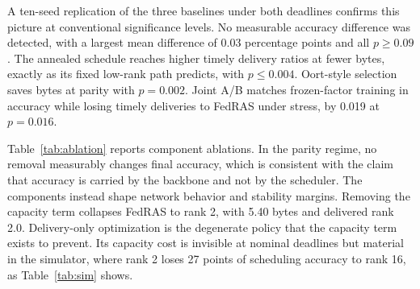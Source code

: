 \documentclass[preprint,12pt]{elsarticle}
\begin{document}
A ten-seed replication of the three baselines under both deadlines confirms this picture at conventional significance levels. No measurable accuracy difference was detected, with a largest mean difference of 0.03 percentage points and all $p\ge0.09$. The annealed schedule reaches higher timely delivery ratios at fewer bytes, exactly as its fixed low-rank path predicts, with $p\le0.004$. Oort-style selection saves bytes at parity with $p=0.002$. Joint A/B matches frozen-factor training in accuracy while losing timely deliveries to FedRAS under stress, by 0.019 at $p=0.016$.

\begin{table}[H]
\centering
\caption{Component ablations, real trainer (non-IID CIFAR-10, five seeds, nominal deadline). The Min. column is the minimum per-seed-mean accuracy over rounds, reported for the elevated-learning-rate stability check at lr $0.02$.}
\label{tab:ablation}
\end{table}

Table~\ref{tab:ablation} reports component ablations. In the parity regime, no removal measurably changes final accuracy, which is consistent with the claim that accuracy is carried by the backbone and not by the scheduler. The components instead shape network behavior and stability margins. Removing the capacity term collapses FedRAS to rank 2, with 5.40 bytes and delivered rank 2.0. Delivery-only optimization is the degenerate policy that the capacity term exists to prevent. Its capacity cost is invisible at nominal deadlines but material in the simulator, where rank 2 loses 27 points of scheduling accuracy to rank 16, as Table~\ref{tab:sim} shows.
\end{document}
